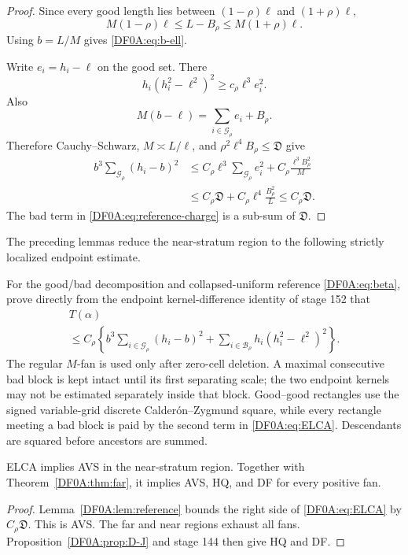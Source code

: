 \begin{proof}
Since every good length lies between $(1-\rho)\ell$ and
$(1+\rho)\ell$,
\[
 M(1-\rho)\ell\le L-B_\rho
 \le M(1+\rho)\ell.
\]
Using $b=L/M$ gives \eqref{DF0A:eq:b-ell}.

Write $e_i=h_i-\ell$ on the good set.  There
\[
 h_i(h_i^2-\ell^2)^2\ge c_\rho\ell^3e_i^2.
\]
Also
\[
 M(b-\ell)=\sum_{i\in\mathcal G_\rho}e_i+B_\rho.
\]
Therefore Cauchy--Schwarz, $M\asymp L/\ell$, and
$\rho^2\ell^4B_\rho\le\mathfrak D$ give
\begin{align*}
 b^3\sum_{\mathcal G_\rho}(h_i-b)^2
 &\le C_\rho\ell^3\sum_{\mathcal G_\rho}e_i^2
   +C_\rho\frac{\ell^3B_\rho^2}{M}\\
 &\le C_\rho\mathfrak D
   +C_\rho\ell^4\frac{B_\rho^2}{L}
 \le C_\rho\mathfrak D.
\end{align*}
The bad term in \eqref{DF0A:eq:reference-charge} is a sub-sum of
$\mathfrak D$.
\end{proof}

The preceding lemmas reduce the near-stratum region to the following
strictly localized endpoint estimate.

\begin{obligation}
\label{DF0A:obl:ELCA}
For the good/bad decomposition and collapsed-uniform reference
\eqref{DF0A:eq:beta}, prove directly from the endpoint kernel-difference
identity of stage 152 that
\begin{multline}\label{DF0A:eq:ELCA}
 T(\alpha)\\
 \le C_\rho\left\{
 b^3\sum_{i\in\mathcal G_\rho}(h_i-b)^2
 +\sum_{i\in\mathcal B_\rho}h_i(h_i^2-\ell^2)^2
 \right\}.
\end{multline}
The regular $M$-fan is used only after zero-cell deletion.  A maximal
consecutive bad block is kept intact until its first separating scale;
the two endpoint kernels may not be estimated separately inside that
block.  Good--good rectangles use the signed variable-grid discrete
Calder\'on--Zygmund square, while every rectangle meeting a bad block is
paid by the second term in \eqref{DF0A:eq:ELCA}.  Descendants are squared
before ancestors are summed.
\end{obligation}

\begin{proposition}
\label{DF0A:prop:ELCA}
ELCA implies AVS in the near-stratum region.  Together with
Theorem~\ref{DF0A:thm:far}, it implies AVS, HQ, and DF for every positive fan.
\end{proposition}

\begin{proof}
Lemma~\ref{DF0A:lem:reference} bounds the right side of \eqref{DF0A:eq:ELCA} by
$C_\rho\mathfrak D$.  This is AVS.  The far and near regions exhaust all
fans.  Proposition~\ref{DF0A:prop:D-J} and stage 144 then give HQ and DF.
\end{proof}
\endgroup

